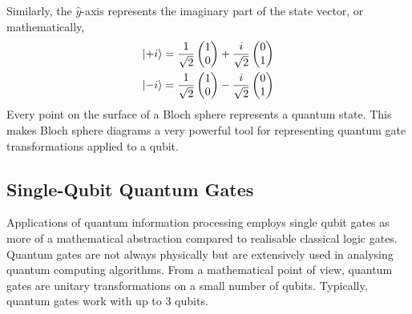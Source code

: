 Similarly, the $\hat{y}$-axis represents the imaginary part of the state vector, or mathematically,
\begin{align}
	\ket{+i}	& = 
	\frac{1}{\sqrt{2}}\left(\begin{matrix}
		1\\
		0
	\end{matrix}\right) + 
	\frac{i}{\sqrt{2}}\left(\begin{matrix}
		0\\
		1
	\end{matrix}\right)\nonumber\\
	\ket{-i}	& = 
	\frac{1}{\sqrt{2}}\left(\begin{matrix}
		1\\
		0
	\end{matrix}\right) - 
	\frac{i}{\sqrt{2}}\left(\begin{matrix}
		0\\
		1
	\end{matrix}\right)\nonumber
\end{align}
Every point on the surface of a Bloch sphere represents a quantum state. This makes Bloch sphere diagrams a very powerful tool for representing quantum gate transformations applied to a qubit.

\subsection{Single-Qubit Quantum Gates\label{subsec:single-q-gates}}

Applications of quantum information processing employs single qubit gates as more of a mathematical abstraction compared to realisable classical logic gates. Quantum gates are not always physically but are extensively used in analysing quantum computing algorithms. From a mathematical point of view, quantum gates are unitary transformations on a small number of qubits. Typically, quantum gates work with up to 3 qubits. 

